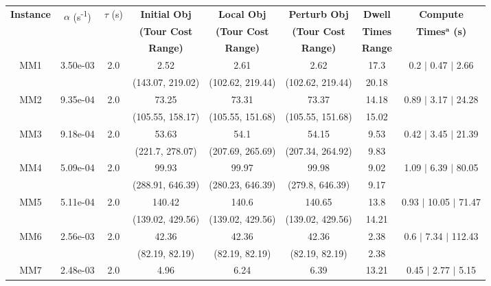 \begin{longtable}{|c|c|c|c|c|c|c|c|}\hline
	\multirow{3}{*}{\textbf{Instance}} & \multirow{3}{*}{$\alpha$ (s\textsuperscript{-1})} & \multirow{3}{*}{$\tau$ (s)} & {\textbf{Initial Obj}} & {\textbf{Local Obj}} & {\textbf{Perturb Obj}} & {\textbf{Dwell}} & {\textbf{Compute}} \\
	 & & & {\textbf{(Tour Cost}} & {\textbf{(Tour Cost}} & {\textbf{(Tour Cost}} & {\textbf{Times}} & {\textbf{Times$^{\mathrm{\boldsymbol{a}}}$ (s)}} \\
	 & & & {\textbf{Range)}} & {\textbf{Range)}} & {\textbf{Range)}} & {\textbf{Range}} & \\
	\hline \hline
	\multirow{2}{*}{MM1} & \multirow{2}{*}{3.50e-03} & \multirow{2}{*}{2.0} & 2.52 & 2.61 & 2.62 & 17.3 & 0.2 $\mid$ 0.47 $\mid$ 2.66\\
	 &  &  & (143.07, 219.02) & (102.62, 219.44) & (102.62, 219.44) & 20.18 & \\
 	\hline
	\multirow{2}{*}{MM2} & \multirow{2}{*}{9.35e-04} & \multirow{2}{*}{2.0} & 73.25 & 73.31 & 73.37 & 14.18 & 0.89 $\mid$ 3.17 $\mid$ 24.28\\
	 &  &  & (105.55, 158.17) & (105.55, 151.68) & (105.55, 151.68) & 15.02 & \\
 	\hline
	\multirow{2}{*}{MM3} & \multirow{2}{*}{9.18e-04} & \multirow{2}{*}{2.0} & 53.63 & 54.1 & 54.15 & 9.53 & 0.42 $\mid$ 3.45 $\mid$ 21.39\\
	 &  &  & (221.7, 278.07) & (207.69, 265.69) & (207.34, 264.92) & 9.83 & \\
 	\hline
	\multirow{2}{*}{MM4} & \multirow{2}{*}{5.09e-04} & \multirow{2}{*}{2.0} & 99.93 & 99.97 & 99.98 & 9.02 & 1.09 $\mid$ 6.39 $\mid$ 80.05\\
	 &  &  & (288.91, 646.39) & (280.23, 646.39) & (279.8, 646.39) & 9.17 & \\
 	\hline
	\multirow{2}{*}{MM5} & \multirow{2}{*}{5.11e-04} & \multirow{2}{*}{2.0} & 140.42 & 140.6 & 140.65 & 13.8 & 0.93 $\mid$ 10.05 $\mid$ 71.47\\
	 &  &  & (139.02, 429.56) & (139.02, 429.56) & (139.02, 429.56) & 14.21 & \\
 	\hline
	\multirow{2}{*}{MM6} & \multirow{2}{*}{2.56e-03} & \multirow{2}{*}{2.0} & 42.36 & 42.36 & 42.36 & 2.38 & 0.6 $\mid$ 7.34 $\mid$ 112.43\\
	 &  &  & (82.19, 82.19) & (82.19, 82.19) & (82.19, 82.19) & 2.38 & \\
 	\hline
	\multirow{2}{*}{MM7} & \multirow{2}{*}{2.48e-03} & \multirow{2}{*}{2.0} & 4.96 & 6.24 & 6.39 & 13.21 & 0.45 $\mid$ 2.77 $\mid$ 5.15\\

\end{longtable}
